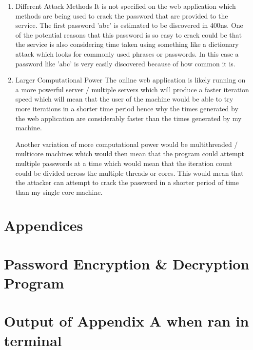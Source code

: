 \documentclass[a4paper, twoside, 11pt]{article}
\begin{document}
\begin{enumerate}
	\item Different Attack Methods
	It is not specified on the web application which methods are being used to crack the password that are provided to the service. 
	The first password 'abc' is estimated to be discovered in 400ns. One of the potential reasons that this password is so easy to crack
	 could be that the service is also considering time taken using something like a dictionary attack which looks for commonly used phrases or passwords. 
	 In this case a password like 'abc' is very easily discovered because of how common it is. 

	
	\item Larger Computational Power
	The online web application is likely running on a more powerful server / multiple servers which will produce a faster iteration speed
	 which will mean that the user of the machine would be able to try more iterations in a shorter time period hence why the times generated
	  by the web application are considerably faster than the times generated by my machine.

	Another variation of more computational power would be multithreaded / multicore machines which would then mean that the program
	could attempt multiple passwords at a time which would mean that the iteration count could be divided across the multiple threads or cores.
	 This would mean that the attacker can attempt to crack the password in a shorter period of time than my single core machine.
\end{enumerate}

\newpage
\section*{Appendices}
\appendix
\section{Password Encryption \& Decryption Program}

\newpage
\section{Output of Appendix A when ran in terminal}

\end{document}
